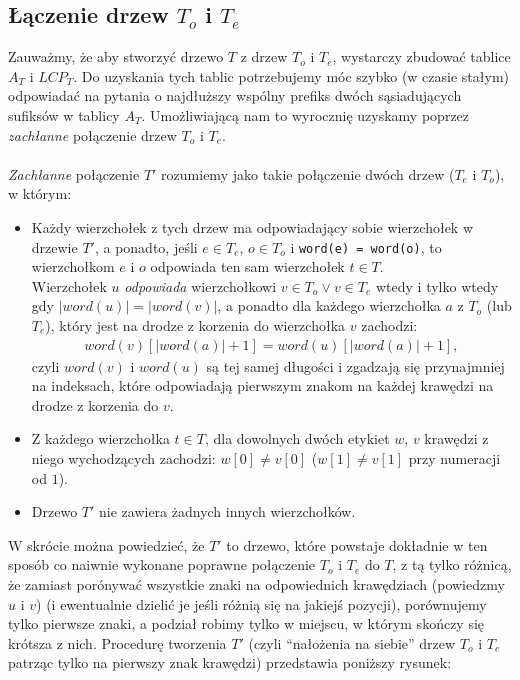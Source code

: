 \subsection{Łączenie drzew $T_o$ i $T_e$}
Zauważmy, że aby stworzyć drzewo $T$ z drzew $T_o$ i $T_e$, wystarczy zbudować tablice $A_T$ i $LCP_T$. Do uzyskania tych tablic potrzebujemy móc szybko (w czasie stałym) odpowiadać na pytania o najdłuższy wspólny prefiks dwóch sąsiadujących sufiksów w tablicy $A_T$. Umożliwiającą nam to wyrocznię uzyskamy poprzez \textit{zachłanne} połączenie drzew $T_o$ i $T_e$. \\ \\
\textit{Zachłanne} połączenie $T'$ rozumiemy jako takie połączenie dwóch drzew ($T_e$ i $T_o$), w którym:
\begin{itemize}
 \item Każdy wierzchołek z tych drzew ma odpowiadający sobie wierzchołek w drzewie $T'$, a ponadto, jeśli $e \in T_e$, $o \in T_o$ i \verb|word(e) = word(o)|, to wierzchołkom $e$ i $o$ odpowiada ten sam wierzchołek $t \in T$. \\
 Wierzchołek $u$ \textit{odpowiada} wierzchołkowi $v \in T_o \vee v \in T_e$ wtedy i tylko wtedy gdy $|word(u)| = |word(v)|$, a ponadto dla każdego wierzchołka $a$ z $T_o$ (lub $T_e$), który jest na drodze z korzenia do wierzchołka $v$ zachodzi:
 \begin{align*}
     word(v)[|word(a)| + 1] = word(u)[|word(a)| + 1],
 \end{align*}
 czyli $word(v)$ i $word(u)$ są tej samej długości i zgadzają się przynajmniej na indeksach, które odpowiadają pierwszym znakom na każdej krawędzi na drodze z korzenia do $v$.
 \item Z każdego wierzchołka $t \in T$, dla dowolnych dwóch etykiet $w$, $v$ krawędzi z niego wychodzących zachodzi: $w[0] \ne v[0]$ ($w[1] \ne v[1]$ przy numeracji od $1$).
 \item Drzewo $T'$ nie zawiera żadnych innych wierzchołków.
\end{itemize}
W skrócie można powiedzieć, że $T'$ to drzewo, które powstaje dokładnie w ten sposób co naiwnie wykonane poprawne połączenie $T_o$ i $T_e$ do $T$, z tą tylko różnicą, że zamiast porónywać wszystkie znaki na odpowiednich krawędziach (powiedzmy $u$ i $v$) (i ewentualnie dzielić je jeśli różnią się na jakiejś pozycji), porównujemy tylko pierwsze znaki, a podział robimy tylko w miejscu, w którym skończy się krótsza z nich. Procedurę tworzenia $T'$ (czyli ``nałożenia na siebie'' drzew $T_o$ i $T_e$ patrząc tylko na pierwszy znak krawędzi) przedstawia poniższy rysunek:
